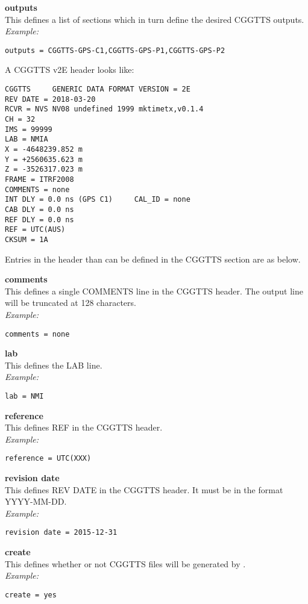 {\bfseries outputs}\\
This defines a list of sections which in turn define the desired CGGTTS outputs.\\
\textit{Example:}
\begin{lstlisting}
outputs = CGGTTS-GPS-C1,CGGTTS-GPS-P1,CGGTTS-GPS-P2
\end{lstlisting}

A CGGTTS v2E header looks like:
\begin{lstlisting}
CGGTTS     GENERIC DATA FORMAT VERSION = 2E
REV DATE = 2018-03-20
RCVR = NVS NV08 undefined 1999 mktimetx,v0.1.4
CH = 32
IMS = 99999
LAB = NMIA
X = -4648239.852 m
Y = +2560635.623 m
Z = -3526317.023 m
FRAME = ITRF2008
COMMENTS = none
INT DLY = 0.0 ns (GPS C1)     CAL_ID = none
CAB DLY = 0.0 ns
REF DLY = 0.0 ns
REF = UTC(AUS)
CKSUM = 1A
\end{lstlisting}

Entries in the header than can be defined in the CGGTTS section are as below. 

{\bfseries comments}\\
This defines a single COMMENTS line in the CGGTTS header.
The output line will be truncated at 128 characters.\\
\textit{Example:}
\begin{lstlisting}
comments = none
\end{lstlisting}

{\bfseries lab }\\
This defines the LAB line.\\
\textit{Example:}
\begin{lstlisting}
lab = NMI
\end{lstlisting}

{\bfseries reference}\\
This defines REF in the CGGTTS header.\\
\textit{Example:}
\begin{lstlisting}
reference = UTC(XXX)
\end{lstlisting}

{\bfseries revision date}\\
This defines REV DATE in the CGGTTS header. It must be in the format YYYY-MM-DD.\\
\textit{Example:}
\begin{lstlisting}
revision date = 2015-12-31
\end{lstlisting}


{\bfseries create}\\
This defines whether or not CGGTTS files will be generated by .\\
\textit{Example:}
\begin{lstlisting}
create = yes
\end{lstlisting}

